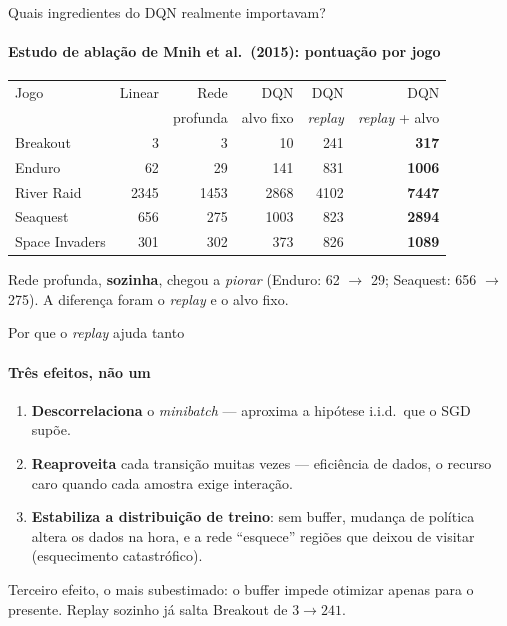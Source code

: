 \documentclass[aspectratio=169, 11pt]{beamer}
\begin{document}
\begin{frame}{Quais ingredientes do DQN realmente importavam?}
  \framesubtitle{Estudo de ablação de Mnih et al.\ (2015): pontuação por jogo}

  \begin{center}\small
  \begin{tabular}{lrrrrr}
    \toprule
    Jogo & Linear & Rede & DQN & DQN & DQN \\
         &        & profunda & alvo fixo & \emph{replay} & \emph{replay} + alvo \\
    \midrule
    Breakout       & 3    & 3    & 10   & 241  & \textbf{317} \\
    Enduro         & 62   & 29   & 141  & 831  & \textbf{1006} \\
    River Raid     & 2345 & 1453 & 2868 & 4102 & \textbf{7447} \\
    Seaquest       & 656  & 275  & 1003 & 823  & \textbf{2894} \\
    Space Invaders & 301  & 302  & 373  & 826  & \textbf{1089} \\
    \bottomrule
  \end{tabular}
  \end{center}

  \begin{alertabox}
    Rede profunda, \textbf{sozinha}, chegou a \emph{piorar} (Enduro: 62
    $\to$ 29; Seaquest: 656 $\to$ 275). A diferença foram o \emph{replay} e
    o alvo fixo.
  \end{alertabox}

\end{frame}

\begin{frame}{Por que o \emph{replay} ajuda tanto}
  \framesubtitle{Três efeitos, não um}

  \begin{enumerate}\setlength{\itemsep}{0.5ex}
    \item \textbf{Descorrelaciona} o \emph{minibatch} — aproxima a hipótese
      i.i.d.\ que o SGD supõe.
    \item \textbf{Reaproveita} cada transição muitas vezes — eficiência de
      dados, o recurso caro quando cada amostra exige interação.
    \item \textbf{Estabiliza a distribuição de treino}: sem buffer, mudança
      de política altera os dados na hora, e a rede ``esquece'' regiões que
      deixou de visitar (esquecimento catastrófico).
  \end{enumerate}

  \begin{ideiabox}
    Terceiro efeito, o mais subestimado: o buffer impede otimizar apenas
    para o presente. Replay sozinho já salta Breakout de $3 \to 241$.
  \end{ideiabox}
\end{frame}
\end{document}
